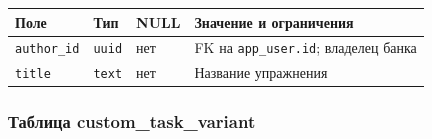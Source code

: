 \documentclass[12pt,a4paper]{article}
\newcounter{none} %
\begin{document}
\hypertarget{таблица-custom_task}{}

{\def\LTcaptype{none} %
\begin{longtable}[]{@{}
  >{\raggedright\arraybackslash}p{}
  >{\raggedright\arraybackslash}p{}
  >{\raggedright\arraybackslash}p{}
  >{\raggedright\arraybackslash}p{}@{}}
\toprule\noalign{}
\begin{minipage}[b]{\linewidth}\raggedright
Поле
\end{minipage} & \begin{minipage}[b]{\linewidth}\raggedright
Тип
\end{minipage} & \begin{minipage}[b]{\linewidth}\raggedright
NULL
\end{minipage} & \begin{minipage}[b]{\linewidth}\raggedright
Значение и ограничения
\end{minipage} \\
\midrule\noalign{}
\endhead
\bottomrule\noalign{}
\endlastfoot
\texttt{author\_id} & \texttt{uuid} & нет & FK на \texttt{app\_\allowbreak{}user.\allowbreak{}id}; владелец банка \\
\texttt{title} & \texttt{text} & нет & Название упражнения \\
\end{longtable}
}

\subsubsection{Таблица custom\_task\_variant}\label{ux442ux430ux431ux43bux438ux446ux430-custom_task_variant}

\hypertarget{таблица-custom_task_variant}{}
\end{document}
